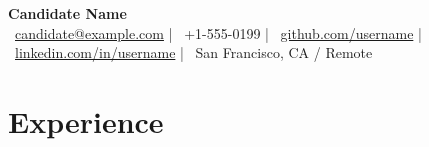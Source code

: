\documentclass[10pt]{article}
\begin{document}
\begin{center}
    {\LARGE \textbf{Candidate Name}} \\[0.2em]
    {\small
    \faEnvelope \ \href{mailto:candidate@example.com}{candidate@example.com} \hspace{3pt} | \hspace{3pt}
    \faPhone \ +1-555-0199 \hspace{3pt} | \hspace{3pt}
    \faGithub \ \href{https://github.com/username}{github.com/username} \hspace{3pt} | \hspace{3pt}
    \faLinkedin \ \href{https://linkedin.com/in/username}{linkedin.com/in/username} \hspace{3pt} | \hspace{3pt}
    \faMapMarker \ San Francisco, CA / Remote
    }
\end{center}
\vspace{-1.2em}

\section*{Experience}
\end{document}
